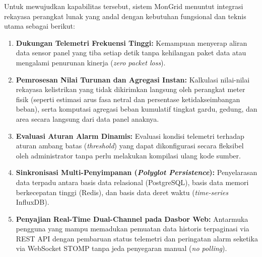 Untuk mewujudkan kapabilitas tersebut, sistem MonGrid menuntut integrasi rekayasa perangkat lunak yang andal dengan kebutuhan fungsional dan teknis utama sebagai berikut:
\begin{enumerate}[label=\alph*., leftmargin=*, itemsep=0pt]
  \item \textbf{Dukungan Telemetri Frekuensi Tinggi:} Kemampuan menyerap aliran data sensor panel yang tiba setiap detik tanpa kehilangan paket data atau mengalami penurunan kinerja (\textit{zero packet loss}).
  \item \textbf{Pemrosesan Nilai Turunan dan Agregasi Instan:} Kalkulasi nilai-nilai rekayasa kelistrikan yang tidak dikirimkan langsung oleh perangkat meter fisik (seperti estimasi arus fasa netral dan persentase ketidakseimbangan beban), serta komputasi agregasi beban kumulatif tingkat gardu, gedung, dan area secara langsung dari data panel anaknya.
  \item \textbf{Evaluasi Aturan Alarm Dinamis:} Evaluasi kondisi telemetri terhadap aturan ambang batas (\textit{threshold}) yang dapat dikonfigurasi secara fleksibel oleh administrator tanpa perlu melakukan kompilasi ulang kode sumber.
  \item \textbf{Sinkronisasi Multi-Penyimpanan (\textit{Polyglot Persistence}):} Penyelarasan data terpadu antara basis data relasional (PostgreSQL), basis data memori berkecepatan tinggi (Redis), dan basis data deret waktu (\textit{time-series} InfluxDB).
  \item \textbf{Penyajian Real-Time Dual-Channel pada Dasbor Web:} Antarmuka pengguna yang mampu memadukan pemuatan data historis terpaginasi via REST API dengan pembaruan status telemetri dan peringatan alarm seketika via WebSocket STOMP tanpa jeda penyegaran manual (\textit{no polling}).
\end{enumerate}

